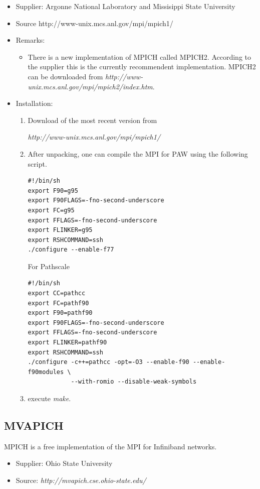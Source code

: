 \documentclass[a4paper,10pt]{report}
\begin{document}
\begin{itemize}
\item Supplier: Argonne National Laboratory and Missisippi State University
\item Source http://www-unix.mcs.anl.gov/mpi/mpich1/
\item Remarks:
\begin{itemize}
\item There is a new implementation of MPICH called MPICH2. According
to the supplier this is the currently recommendent implementation.
MPICH2 can be downloaded from
\textit{http://www-unix.mcs.anl.gov/mpi/mpich2/index.htm}.
\end{itemize}
\item Installation:
\begin{enumerate}
\item Download of the most recent version from
\begin{center}
\textit{http://www-unix.mcs.anl.gov/mpi/mpich1/}
\end{center}
\item After unpacking, one can compile the MPI for PAW using the following script.
\begin{verbatim}
#!/bin/sh
export F90=g95
export F90FLAGS=-fno-second-underscore
export FC=g95
export FFLAGS=-fno-second-underscore
export FLINKER=g95
export RSHCOMMAND=ssh
./configure --enable-f77
\end{verbatim}
For Pathscale
\begin{verbatim}
#!/bin/sh
export CC=pathcc
export FC=pathf90 
export F90=pathf90 
export F90FLAGS=-fno-second-underscore 
export FFLAGS=-fno-second-underscore
export FLINKER=pathf90
export RSHCOMMAND=ssh
./configure -c++=pathcc -opt=-O3 --enable-f90 --enable-f90modules \
            --with-romio --disable-weak-symbols 
\end{verbatim}

\item execute \textit{make}.
\end{enumerate}
\end{itemize}

\subsection{MVAPICH}
\label{sec:mvapich}
MPICH is a free implementation of the MPI for  Infiniband networks.
\begin{itemize}
\item Supplier: Ohio State University
\item Source: \textit{http://mvapich.cse.ohio-state.edu/}
\end{itemize}
\end{document}

